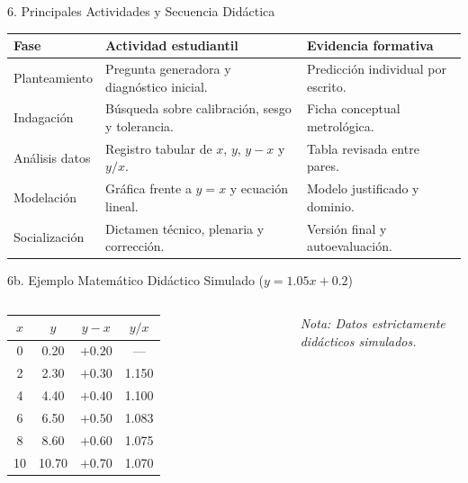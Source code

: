 \documentclass[aspectratio=169,spanish,xcolor=table]{beamer}
\begin{document}
\begin{frame}{6. Principales Actividades y Secuencia Didáctica}
  \scriptsize\renewcommand{\arraystretch}{1.3}
  \begin{tabular}{p{2.3cm}p{5.8cm}p{4.8cm}}
    \toprule
    \rowcolor{iiiepePale} \textbf{Fase} & \textbf{Actividad estudiantil} & \textbf{Evidencia formativa} \\
    \midrule
    Planteamiento & Pregunta generadora y diagnóstico inicial. & Predicción individual por escrito. \\
    Indagación & Búsqueda sobre calibración, sesgo y tolerancia. & Ficha conceptual metrológica. \\
    Análisis datos & Registro tabular de $x$, $y$, $y-x$ y $y/x$. & Tabla revisada entre pares. \\
    Modelación & Gráfica frente a $y=x$ y ecuación lineal. & Modelo justificado y dominio. \\
    Socialización & Dictamen técnico, plenaria y corrección. & Versión final y autoevaluación. \\
    \bottomrule
  \end{tabular}
\end{frame}

\begin{frame}{6b. Ejemplo Matemático Didáctico Simulado ($y = 1.05x + 0.2$)}
  \begin{columns}[T]
      \scriptsize\renewcommand{\arraystretch}{1.3}
      \begin{tabular}{c|c|c|c}
        \toprule
        \rowcolor{iiiepePale} $x$ & $y$ & $y-x$ & $y/x$ \\
        \midrule
        0 & 0.20 & $+0.20$ & --- \\
        2 & 2.30 & $+0.30$ & 1.150 \\
        4 & 4.40 & $+0.40$ & 1.100 \\
        6 & 6.50 & $+0.50$ & 1.083 \\
        8 & 8.60 & $+0.60$ & 1.075 \\
        10 & 10.70 & $+0.70$ & 1.070 \\
        \bottomrule
      \end{tabular}
      \par\medskip\noindent
      \tiny \textit{Nota: Datos estrictamente didácticos simulados.}
      \centering
  \end{columns}
\end{frame}
\end{document}
